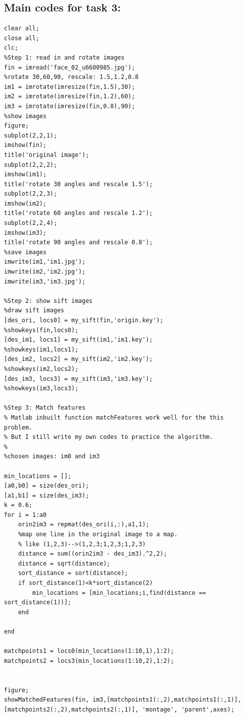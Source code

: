 \documentclass{article}
\begin{document}
\subsection*{Main codes for task 3:}
\begin{lstlisting}
clear all;
close all;
clc;
%Step 1: read in and rotate images
fin = imread('face_02_u6600985.jpg');
%rotate 30,60,90, rescale: 1.5,1.2,0.8
im1 = imrotate(imresize(fin,1.5),30);
im2 = imrotate(imresize(fin,1.2),60);
im3 = imrotate(imresize(fin,0.8),90);
%show images
figure;
subplot(2,2,1);
imshow(fin);
title('original image');
subplot(2,2,2);
imshow(im1);
title('rotate 30 angles and rescale 1.5');
subplot(2,2,3);
imshow(im2);
title('rotate 60 angles and rescale 1.2');
subplot(2,2,4);
imshow(im3);
title('rotate 90 angles and rescale 0.8');
%save images
imwrite(im1,'im1.jpg');
imwrite(im2,'im2.jpg');
imwrite(im3,'im3.jpg');

%Step 2: show sift images
%draw sift images
[des_ori, locs0] = my_sift(fin,'origin.key');
%showkeys(fin,locs0);
[des_im1, locs1] = my_sift(im1,'im1.key');
%showkeys(im1,locs1);
[des_im2, locs2] = my_sift(im2,'im2.key');
%showkeys(im2,locs2);
[des_im3, locs3] = my_sift(im3,'im3.key');
%showkeys(im3,locs3);

%Step 3: Match features
% Matlab inbuilt function matchFeatures work well for the this problem.
% But I still write my own codes to practice the algorithm.
%
%chosen images: im0 and im3

min_locations = [];
[a0,b0] = size(des_ori);
[a1,b1] = size(des_im3);
k = 0.6;
for i = 1:a0
    orin2im3 = repmat(des_ori(i,:),a1,1);
    %map one line in the original image to a map.
    % like (1,2,3)-->(1,2,3;1,2,3;1,2,3)
    distance = sum((orin2im3 - des_im3).^2,2);
    distance = sqrt(distance);
    sort_distance = sort(distance);
    if sort_distance(1)<k*sort_distance(2)
        min_locations = [min_locations;i,find(distance == sort_distance(1))];
    end
    
end

matchpoints1 = locs0(min_locations(1:10,1),1:2);
matchpoints2 = locs3(min_locations(1:10,2),1:2);


figure;
showMatchedFeatures(fin, im3,[matchpoints1(:,2),matchpoints1(:,1)], [matchpoints2(:,2),matchpoints2(:,1)], 'montage', 'parent',axes);

\end{lstlisting}
\end{document}
